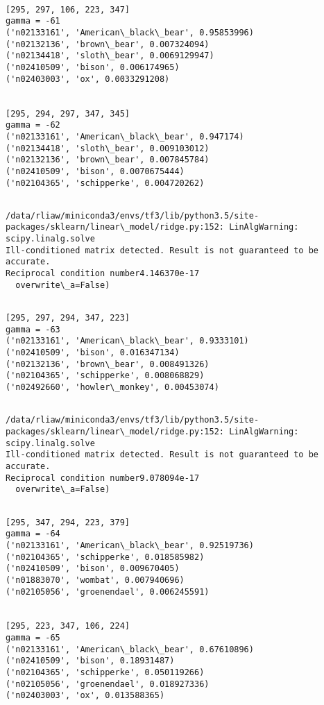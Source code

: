 \documentclass[11pt]{article}
\begin{document}
    \begin{Verbatim}[commandchars=\\\{\}]

[295, 297, 106, 223, 347]
gamma = -61
('n02133161', 'American\_black\_bear', 0.95853996)
('n02132136', 'brown\_bear', 0.007324094)
('n02134418', 'sloth\_bear', 0.0069129947)
('n02410509', 'bison', 0.006174965)
('n02403003', 'ox', 0.0033291208)


[295, 294, 297, 347, 345]
gamma = -62
('n02133161', 'American\_black\_bear', 0.947174)
('n02134418', 'sloth\_bear', 0.009103012)
('n02132136', 'brown\_bear', 0.007845784)
('n02410509', 'bison', 0.0070675444)
('n02104365', 'schipperke', 0.004720262)


    \end{Verbatim}

    \begin{Verbatim}[commandchars=\\\{\}]
/data/rliaw/miniconda3/envs/tf3/lib/python3.5/site-packages/sklearn/linear\_model/ridge.py:152: LinAlgWarning: scipy.linalg.solve
Ill-conditioned matrix detected. Result is not guaranteed to be accurate.
Reciprocal condition number4.146370e-17
  overwrite\_a=False)

    \end{Verbatim}

    \begin{Verbatim}[commandchars=\\\{\}]

[295, 297, 294, 347, 223]
gamma = -63
('n02133161', 'American\_black\_bear', 0.9333101)
('n02410509', 'bison', 0.016347134)
('n02132136', 'brown\_bear', 0.008491326)
('n02104365', 'schipperke', 0.008068829)
('n02492660', 'howler\_monkey', 0.00453074)


    \end{Verbatim}

    \begin{Verbatim}[commandchars=\\\{\}]
/data/rliaw/miniconda3/envs/tf3/lib/python3.5/site-packages/sklearn/linear\_model/ridge.py:152: LinAlgWarning: scipy.linalg.solve
Ill-conditioned matrix detected. Result is not guaranteed to be accurate.
Reciprocal condition number9.078094e-17
  overwrite\_a=False)

    \end{Verbatim}

    \begin{Verbatim}[commandchars=\\\{\}]

[295, 347, 294, 223, 379]
gamma = -64
('n02133161', 'American\_black\_bear', 0.92519736)
('n02104365', 'schipperke', 0.018585982)
('n02410509', 'bison', 0.009670405)
('n01883070', 'wombat', 0.007940696)
('n02105056', 'groenendael', 0.006245591)


[295, 223, 347, 106, 224]
gamma = -65
('n02133161', 'American\_black\_bear', 0.67610896)
('n02410509', 'bison', 0.18931487)
('n02104365', 'schipperke', 0.050119266)
('n02105056', 'groenendael', 0.018927336)
('n02403003', 'ox', 0.013588365)


    \end{Verbatim}
\end{document}
